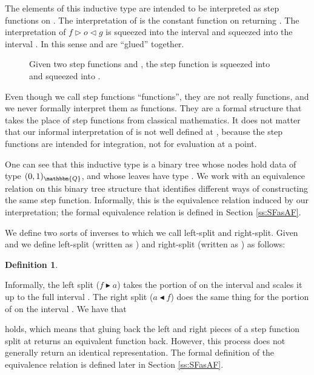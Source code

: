 \documentclass{elsarticle}
\newcommand{\tmtextsf}[1]{{\sffamily{#1}}}
\newtheorem{definition}{Definition}
\newcommand{\glue}[3]{\ensuremath{#1 \vartriangleright #2 \vartriangleleft #3}}
\newcommand{\splitl}[2]{\ensuremath{#1 \blacktriangleright #2}}
\newcommand{\splitr}[2]{\ensuremath{#2 \blacktriangleleft #1}}
\newcommand{\ou}{\ensuremath{(0,1)_{\mathbbm{Q}}}}
\begin{document}
The elements of this inductive type are intended to be interpreted as step
functions on . The interpretation of  is the constant
function on  returning . The interpretation of {\glue{f}{o}{g}} is
 squeezed into the interval  and  squeezed into the interval
. In this sense  and  are ``glued'' together.

\begin{figure}[h]\begin{center}
  \end{center}
  \caption{Given two step functions  and , the step function
   is  squeezed into  and  squeezed into .}
\end{figure}

Even though we call step functions ``functions'', they are not really
functions, and we never formally interpret them as functions. They are a
formal structure that takes the place of step functions from classical
mathematics. It does not matter that our informal interpretation of
 is not well defined at , because the step functions are
intended for integration, not for evaluation at a point.

One can see that this inductive type is a binary tree whose nodes hold data of
type {\ou}, and whose leaves have type . We work with an equivalence
relation on this binary tree structure that identifies different ways of
constructing the same step function. Informally, this is the equivalence
relation induced by our interpretation; the formal equivalence relation is
defined in Section \ref{ss:SFasAF}.

We define two sorts of inverses to \tmtextsf{glue} which we call
left-split and
right-split. Given  and  we define left-split
(written as ) and right-split
(written as ) as follows:

\begin{definition}
  
\end{definition}

Informally, the left split ({\splitl{f}{a}}) takes the portion of  on the
interval  and scales it up to the full interval . The right
split ({\splitr{f}{a}}) does the same thing for the portion of  on the
interval . We have that

holds, which means that gluing back the left and right pieces of a
step function split at  returns an equivalent function back. However, this
process does not generally return an identical representation. The formal
definition of the equivalence relation is defined later in Section
\ref{ss:SFasAF}.
\end{document}
